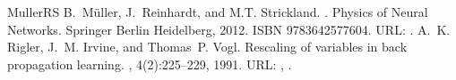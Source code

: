 \documentclass[letterpaper,10pt,english]{jupyterBook}
\begin{document}
\begin{sphinxthebibliography}{MullerRS}
\sphinxAtStartPar
B. Müller, J. Reinhardt, and M.T. Strickland. . Physics of Neural Networks. Springer Berlin Heidelberg, 2012. ISBN 9783642577604. URL: .
\sphinxAtStartPar
A. K. Rigler, J. M. Irvine, and Thomas P. Vogl. Rescaling of variables in back propagation learning. , 4(2):225–229, 1991. URL: , .
\end{sphinxthebibliography}







\renewcommand{\indexname}{Index}
\printindex
\end{document}

